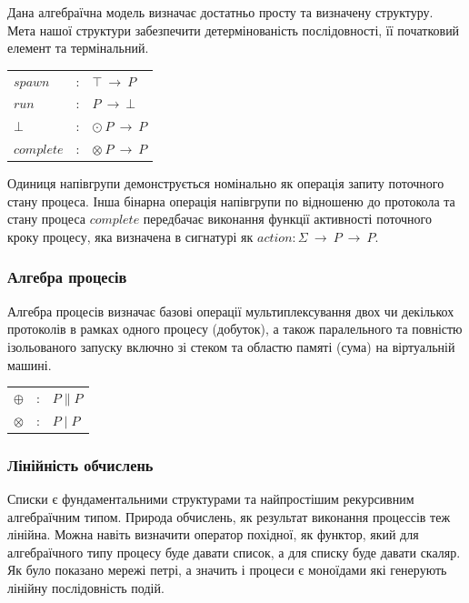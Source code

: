 \documentclass[11pt,oneside]{article}
\begin{document}
  Дана алгебраїчна модель визначає достатньо просту та визначену структуру.
  Мета нашої структури забезпечити детермінованість послідовності,
  її початковий елемент та термінальний. 

\begin{center}
\begin{tabular}{lcl}
$spawn$       &:& $\top\ \rightarrow\ P$\\
$run$         &:& $P\ \rightarrow\ \bot$\\
$\bot$        &:& $\odot\ P\ \rightarrow\ P$\\
$complete$    &:& $\otimes\ P\ \rightarrow\ P$\\
\end{tabular}
\end{center}

  Одиниця напівгрупи
  демонструється номінально як операція запиту поточного стану процеса.
  Інша бінарна операція напівгрупи по відношеню до протокола та стану процеса $complete$
  передбачає виконання функції активності поточного кроку процесу, яка
  визначена в сигнатурі як $action: \Sigma\ \rightarrow\ P\ \rightarrow\ P$.

  \subsubsection*{Алгебра процесів}

  Алгебра процесів визначає базові операції мультиплексування двох чи декількох
  протоколів в рамках одного процесу (добуток), а також паралельного та повністю
  ізольованого запуску включно зі стеком та областю памяті (сума) на
  віртуальній машині.

\begin{center}
\begin{tabular}{lcl}
$\oplus$   &:& $P \parallel P$\\
$\otimes$  &:& $P \mid P$\\
\end{tabular}
\end{center}

  \subsubsection*{Лінійність обчислень}

   Списки
   є фундаментальними структурами та найпростішим рекурсивним алгебраїчним типом.
   Природа обчислень, як результат виконання процессів теж лінійна. Можна навіть визначити
   оператор похідної, як функтор, який для алгебраїчного типу процесу буде давати список,
   а для списку буде давати скаляр. Як було показано \cite{meseguer} мережі петрі,
   а значить і процеси є моноїдами які генерують лінійну послідовність подій.
\end{document}
